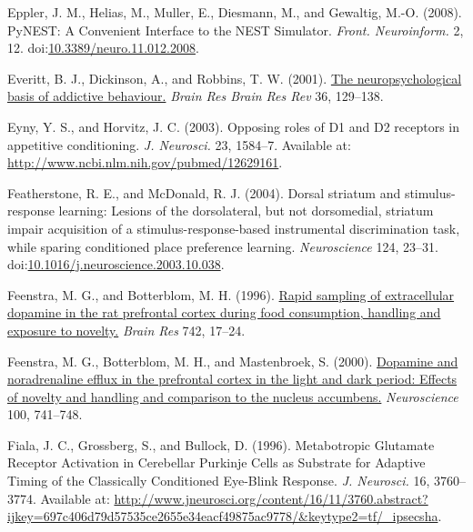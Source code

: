 \documentclass[
  11pt,
  a4paper,
]{scrbook}
\newlength{\cslhangindent}
\newenvironment{CSLReferences}[2] %
 {\begin{list}{}{%
  \setlength{\itemindent}{0pt}
  \setlength{\leftmargin}{0pt}
  \setlength{\parsep}{0pt}
  \ifodd #1
   \setlength{\leftmargin}{\cslhangindent}
   \setlength{\itemindent}{-1\cslhangindent}
  \fi
  \setlength{\itemsep}{#2\baselineskip}}}
 {\end{list}}
\begin{document}
\begin{CSLReferences}{1}{1}
Eppler, J. M., Helias, M., Muller, E., Diesmann, M., and Gewaltig, M.-O.
(2008). {PyNEST: A Convenient Interface to the NEST Simulator.}
\emph{Front. Neuroinform.} 2, 12.
doi:\href{https://doi.org/10.3389/neuro.11.012.2008}{10.3389/neuro.11.012.2008}.

Everitt, B. J., Dickinson, A., and Robbins, T. W. (2001).
\href{https://www.ncbi.nlm.nih.gov/pubmed/11690609}{The
neuropsychological basis of addictive behaviour.} \emph{Brain Res Brain
Res Rev} 36, 129--138.

Eyny, Y. S., and Horvitz, J. C. (2003). {Opposing roles of D1 and D2
receptors in appetitive conditioning.} \emph{J. Neurosci.} 23, 1584--7.
Available at: \url{http://www.ncbi.nlm.nih.gov/pubmed/12629161}.

Featherstone, R. E., and McDonald, R. J. (2004). Dorsal striatum and
stimulus-response learning: Lesions of the dorsolateral, but not
dorsomedial, striatum impair acquisition of a stimulus-response-based
instrumental discrimination task, while sparing conditioned place
preference learning. \emph{Neuroscience} 124, 23--31.
doi:\href{https://doi.org/10.1016/j.neuroscience.2003.10.038}{10.1016/j.neuroscience.2003.10.038}.

Feenstra, M. G., and Botterblom, M. H. (1996).
\href{https://www.ncbi.nlm.nih.gov/pubmed/9117391}{Rapid sampling of
extracellular dopamine in the rat prefrontal cortex during food
consumption, handling and exposure to novelty.} \emph{Brain Res} 742,
17--24.

Feenstra, M. G., Botterblom, M. H., and Mastenbroek, S. (2000).
\href{https://www.ncbi.nlm.nih.gov/pubmed/11036208}{Dopamine and
noradrenaline efflux in the prefrontal cortex in the light and dark
period: Effects of novelty and handling and comparison to the nucleus
accumbens.} \emph{Neuroscience} 100, 741--748.

Fiala, J. C., Grossberg, S., and Bullock, D. (1996). {Metabotropic
Glutamate Receptor Activation in Cerebellar Purkinje Cells as Substrate
for Adaptive Timing of the Classically Conditioned Eye-Blink Response}.
\emph{J. Neurosci.} 16, 3760--3774. Available at:
\url{http://www.jneurosci.org/content/16/11/3760.abstract?ijkey=697c406d79d57535ce2655e34eacf49875ac9778/&keytype2=tf/_ipsecsha}.


\end{CSLReferences}
\end{document}
